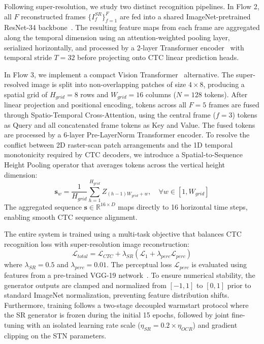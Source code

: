 \documentclass[sigconf]{acmart}
\begin{document}
Following super-resolution, we study two distinct recognition pipelines. In Flow 2, all $F$ reconstructed frames $\{I_f^{SR}\}_{f=1}^F$ are fed into a shared ImageNet-pretrained ResNet-34 backbone~\cite{he2016resnet}. The resulting feature maps from each frame are aggregated along the temporal dimension using an attention-weighted pooling layer, serialized horizontally, and processed by a 2-layer Transformer encoder~\cite{vaswani2017attention} with temporal stride $T = 32$ before projecting onto CTC linear prediction heads.

In Flow 3, we implement a compact Vision Transformer~\cite{dosovitskiy2020vit} alternative. The super-resolved image is split into non-overlapping patches of size $4 \times 8$, producing a spatial grid of $H_{grid} = 8$ rows and $W_{grid} = 16$ columns ($N = 128$ tokens). After linear projection and positional encoding, tokens across all $F = 5$ frames are fused through Spatio-Temporal Cross-Attention, using the central frame ($f = 3$) tokens as Query and all concatenated frame tokens as Key and Value. The fused tokens are processed by a 6-layer Pre-LayerNorm Transformer encoder. To resolve the conflict between 2D raster-scan patch arrangements and the 1D temporal monotonicity required by CTC decoders, we introduce a Spatial-to-Sequence Height Pooling operator that averages tokens across the vertical height dimension:
\begin{equation}
\mathbf{s}_w = \frac{1}{H_{grid}} \sum_{h=1}^{H_{grid}} Z_{(h-1)W_{grid} + w}, \quad \forall w \in [1, W_{grid}]
\label{eq:height_pool}
\end{equation}
The aggregated sequence $\mathbf{s} \in \mathbb{R}^{16 \times D}$ maps directly to 16 horizontal time steps, enabling smooth CTC sequence alignment.

The entire system is trained using a multi-task objective that balances CTC recognition loss with super-resolution image reconstruction:
\begin{equation}
\mathcal{L}_{total} = \mathcal{L}_{CTC} + \lambda_{SR} \left(\mathcal{L}_1 + \lambda_{perc} \mathcal{L}_{perc}\right)
\label{eq:loss_total}
\end{equation}
where $\lambda_{SR} = 0.5$ and $\lambda_{perc} = 0.01$. The perceptual loss $\mathcal{L}_{perc}$ is evaluated using features from a pre-trained VGG-19 network~\cite{simonyan2014vgg, johnson2016perceptual}. To ensure numerical stability, the generator outputs are clamped and normalized from $[-1, 1]$ to $[0, 1]$ prior to standard ImageNet normalization, preventing feature distribution shifts. Furthermore, training follows a two-stage decoupled warmstart protocol where the SR generator is frozen during the initial 15 epochs, followed by joint fine-tuning with an isolated learning rate scale ($\eta_{SR} = 0.2 \times \eta_{OCR}$) and gradient clipping on the STN parameters.
\end{document}
